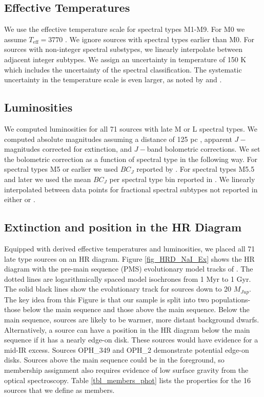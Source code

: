 \subsection{Effective Temperatures}
We use the \cite{2003ApJ...593.1093L} effective temperature scale for spectral types M1-M9.  For M0 we assume $T_{\mathrm{eff}}= 3770$ \citep{2013ApJS..208....9P}.  We ignore sources with spectral types earlier than M0.  For sources with non-integer spectral substypes, we linearly interpolate between adjacent integer subtypes.  We assign an uncertainty in temperature of 150 K which includes the uncertainty of the spectral classification.  The systematic uncertainty in the temperature scale is even larger, as noted by \citet{2013ApJS..208....9P} and \citet{2010ApJS..186...63R}.

\subsection{Luminosities}
We computed luminosities for all 71 sources with late M or L spectral types.  We computed absolute magnitudes assuming a distance of 125 pc \citep{2008ApJ...675L..29L}, apparent $J-$ magnitudes corrected for extinction, and $J-$band bolometric corrections.  We set the bolometric correction as a function of spectral type in the following way.  For spectral types M5 or earlier we used $BC_J$ reported by \citep{2013ApJS..208....9P}.  For spectral types M5.5 and later we used the mean $BC_J$ per spectral type bin reported in \citet{2002AJ....124.1170D}.  We linearly interpolated between data points for fractional spectral subtypes not reported in either \citet{2002AJ....124.1170D} or \citet{2013ApJS..208....9P}.


\subsection{Extinction and position in the HR Diagram}
\label{sec_HRD}
Equipped with derived effective temperatures and luminosities, we placed all 71 late type sources on an HR diagram.  Figure \ref{fig_HRD_NaI_Ex} shows the HR diagram with the pre-main sequence (PMS) evolutionary model tracks of \citep{1998A&A...337..403B,2002A&A...382..563B}.  The dotted lines are logarithmically spaced model isochrones from 1 Myr to 1 Gyr.  The solid black lines show the evolutionary track for sources down to 20 $M_{Jup}$.  The key idea from this Figure is that our sample is split into two populations- those below the main sequence and those above the main sequence.  Below the main sequence, sources are likely to be warmer, more distant background dwarfs.  Alternatively, a source can have a position in the HR diagram below the main sequence if it has a nearly edge-on disk.  These sources would have evidence for a mid-IR excess.  Sources OPH\_349 and OPH\_2 demonstrate potential edge-on disks.  Sources above the main sequence could be in the foreground, so membership assignment also requires evidence of low surface gravity from the optical spectroscopy.  Table \ref{tbl_members_phot} lists the properties for the 16 sources that we define as members.

